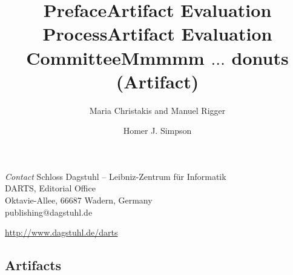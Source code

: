 \documentclass[a4paper,UKenglish]{dartsmaster-v2019}
\begin{document}
\begin{publicationinfo}
\bigskip
\emph{Contact}\newline
Schloss Dagstuhl -- Leibniz-Zentrum f\"ur Informatik\\
DARTS, Editorial Office\\
Oktavie-Allee, 66687 Wadern, Germany\\
publishing@dagstuhl.de


\bigskip

\url{http://www.dagstuhl.de/darts}

 \thispagestyle{empty}
 \onecolumn

\newpage

\end{publicationinfo}




\begin{contentslist}

\contitem
\title{Preface}
\author{Maria Christakis and Manuel Rigger}

\contitem
\title{Artifact Evaluation Process}
\author{ }

\contitem
\title{Artifact Evaluation Committee}
\author{ }


\part{Artifacts}


\contitem
\title{Mmmmm $\ldots$ donuts (Artifact)}
\author{Homer J. Simpson}


\end{contentslist}
\end{document}
